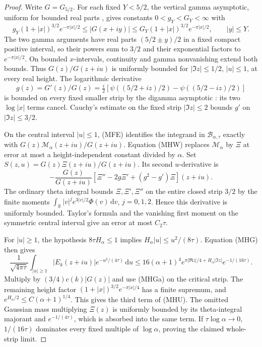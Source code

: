 \documentclass[11pt]{article}
\theoremstyle{remark}\newtheorem{remark}[theorem]{Remark}
\newcommand{\R}{\mathbb R}
\newcommand{\dd}{\,\mathrm d}
\begin{document}
\begin{proof}
Write $G=G_{5/2}$. For each fixed $Y<5/2$, the vertical gamma
asymptotic, uniform for bounded real parts
\cite[eq.~(5.11.9)]{DLMFGamma}, gives constants $0<g_Y<G_Y<\infty$ with
\[
 g_Y(1+|x|)^{3/2}e^{-\pi|x|/2}
 \le |G(x+iy)|\le
 G_Y(1+|x|)^{3/2}e^{-\pi|x|/2},\qquad |y|\le Y.
 \tag{MHGa}
\]
The two gamma arguments have real parts $(5/2\pm y)/2$ in a fixed
compact positive interval, so their powers sum to $3/2$ and their
exponential factors to $e^{-\pi|x|/2}$. On bounded $x$-intervals,
continuity and gamma nonvanishing extend both bounds.
Thus $G(z)/G(z+iu)$ is uniformly bounded for
$|\Im z|\le1/2$, $|u|\le1$, at every real height.
The logarithmic derivative
\[
 g(z)=G'(z)/G(z)=\tfrac i2
 [\psi((5/2+iz)/2)-\psi((5/2-iz)/2)]
\]
is bounded on every fixed smaller strip by the digamma asymptotic
\cite[eq.~(5.11.2)]{DLMFGamma}: its two $\log|x|$ terms cancel.
Cauchy's estimate on the fixed strip $|\Im z|\le2$ bounds $g'$
on $|\Im z|\le3/2$.

On the central interval $|u|\le1$, (MFE) identifies the integrand
in $\mathcal B_{\alpha,\tau}$ exactly with
$G(z)\mathcal M_\alpha(z+iu)/G(z+iu)$.
Equation (MHW) replaces $\mathcal M_\alpha$ by $\Xi$ at error
at most a height-independent constant divided by $\alpha$.
Set $S(z,u)=G(z)\Xi(z+iu)/G(z+iu)$. Its second $u$-derivative is
\[
 -\frac{G(z)}{G(z+iu)}
       [\Xi''-2g\Xi'+(g^2-g')\Xi](z+iu).
\]
The ordinary theta integral bounds $\Xi,\Xi',\Xi''$ on the entire
closed strip $3/2$ by the finite moments
$\int_\R |v|^j e^{3|v|/2}\Phi(v)\dd v$, $j=0,1,2$.
Hence this derivative is uniformly bounded. Taylor's formula and
the vanishing first moment on the symmetric central interval give
an error at most $C_2\tau$.

For $|u|\ge1$, the hypothesis $8\tau H_\alpha\le1$ implies
$H_\alpha|u|\le u^2/(8\tau)$. Equation (MHG) then gives
\[
 \frac1{\sqrt{4\pi\tau}}\int_{|u|\ge1}
    |E_k(z+iu)|e^{-u^2/(4\tau)}\dd u
 \le16(\alpha+1)^4
      e^{\pi|\Re z|/4+H_\alpha|\Im z|}e^{-1/(16\tau)}.
\]
Multiply by $(3/4)c(k)|G(z)|$ and use (MHGa) on the critical strip.
The remaining height factor
$(1+|x|)^{3/2}e^{-\pi|x|/4}$ has a finite supremum, and
$e^{H_\alpha/2}\le C(\alpha+1)^{1/4}$. This gives the third
term of (MHU). The omitted Gaussian mass multiplying $\Xi(z)$
is uniformly bounded by its theta-integral majorant and
$e^{-1/(4\tau)}$, which is absorbed into the same term.
If $\tau\log\alpha\to0$, $1/(16\tau)$ dominates every fixed
multiple of $\log\alpha$, proving the claimed whole-strip limit.


\end{proof}
\end{document}
